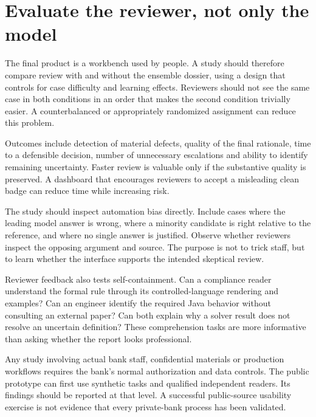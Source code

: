 \section{Evaluate the reviewer, not only the model}
\label{merge:M09:11}


The final product is a workbench used by people. A study should therefore compare
review with and without the ensemble dossier, using a design that controls for
case difficulty and learning effects. Reviewers should not see the same case in
both conditions in an order that makes the second condition trivially easier.
A counterbalanced or appropriately randomized assignment can reduce this problem.

Outcomes include detection of material defects, quality of the final rationale,
time to a defensible decision, number of unnecessary escalations and ability to
identify remaining uncertainty. Faster review is valuable only if the substantive
quality is preserved. A dashboard that encourages reviewers to accept a misleading
clean badge can reduce time while increasing risk.


The study should inspect automation bias directly. Include cases where the
leading model answer is wrong, where a minority candidate is right relative to
the reference, and where no single answer is justified. Observe whether reviewers
inspect the opposing argument and source. The purpose is not to trick staff, but
to learn whether the interface supports the intended skeptical review.

Reviewer feedback also tests self-containment. Can a compliance reader understand
the formal rule through its controlled-language rendering and examples? Can an
engineer identify the required Java behavior without consulting an external paper?
Can both explain why a solver result does not resolve an uncertain definition?
These comprehension tasks are more informative than asking whether the report
looks professional.

Any study involving actual bank staff, confidential materials or production
workflows requires the bank's normal authorization and data controls. The public
prototype can first use synthetic tasks and qualified independent readers.
Its findings should be reported at that level. A successful public-source
usability exercise is not evidence that every private-bank process has been
validated.

